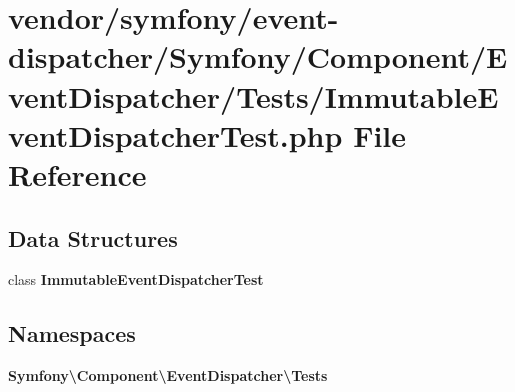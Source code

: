 \section{vendor/symfony/event-\/dispatcher/\+Symfony/\+Component/\+Event\+Dispatcher/\+Tests/\+Immutable\+Event\+Dispatcher\+Test.php File Reference}
\label{_immutable_event_dispatcher_test_8php}
\subsection*{Data Structures}
\begin{DoxyCompactItemize}
\item 
class {\bf Immutable\+Event\+Dispatcher\+Test}
\end{DoxyCompactItemize}
\subsection*{Namespaces}
\begin{DoxyCompactItemize}
\item 
 {\bf Symfony\textbackslash{}\+Component\textbackslash{}\+Event\+Dispatcher\textbackslash{}\+Tests}
\end{DoxyCompactItemize}
